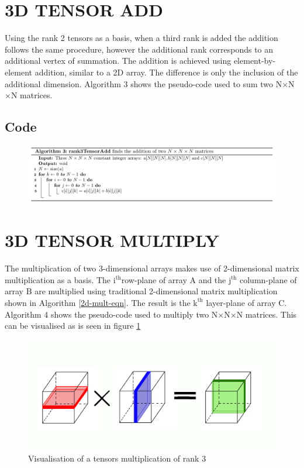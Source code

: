 \section{3D TENSOR ADD}
Using the rank 2 tensors as a basis, when a third rank is added the addition follows the same procedure, however the additional rank corresponds to an additional vertex of summation. The addition is achieved using element-by-element addition, similar to a 2D array. The difference is only the inclusion of the additional dimension. Algorithm 3 shows the pseudo-code used to sum two N$\times$N$\times$N matrices.
\subsection{Code}
\begin{figure}[H]
\includegraphics[width=\textwidth]{build/Algo3.png}
\end{figure}
\section{3D TENSOR MULTIPLY}
The multiplication of two 3-dimensional arrays makes use of 2-dimensional matrix multiplication as a basis. The $\text{i}^\text{th}$row-plane of array A and the $\text{j}^\text{th}$ column-plane of array B are multiplied using traditional 2-dimensional matrix multiplication shown in Algorithm \ref{2d-mult-eqn}. The result is the $\text{k}^\text{th}$ layer-plane of array C. Algorithm 4 shows the pseudo-code used to multiply two N$\times$N$\times$N matrices. This can be visualised as is seen in figure \ref{3D}
\begin{figure}
\centering
\includegraphics[scale=0.5]{build/3Dmult.png}
\caption{Visualisation of a tensors multiplication of rank 3}
\label{3D}
\end{figure}
